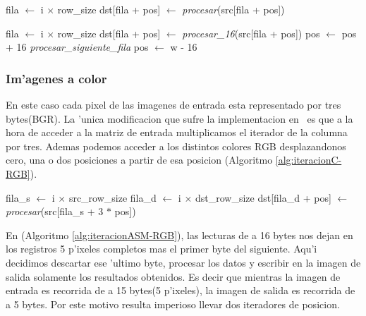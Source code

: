 \begin{algorithm}[h!]
\caption{}\label{alg:iteracionC-BN}
\begin{algorithmic}[1]
	\STATE fila $\leftarrow$ i $\times$ row\_size
		\STATE dst[fila + pos] $\leftarrow$ \textit{procesar}(src[fila + pos])
	\ENDFOR
\ENDFOR
\end{algorithmic}
\end{algorithm}

\begin{algorithm}[h!]
\caption{}\label{alg:iteracionASM-BN}
\begin{algorithmic}[1]
	\STATE fila $\leftarrow$ i $\times$ row\_size
		\STATE dst[fila + pos] $\leftarrow$ \textit{procesar_{16}}(src[fila + pos])
		\STATE pos $\leftarrow$ pos + 16		
			\STATE \textit{procesar\_siguiente\_fila}
			\STATE pos $\leftarrow$ w - 16
		\ENDIF
		
	\ENDFOR
\ENDFOR
\end{algorithmic}
\end{algorithm}

\subsubsection{Im'agenes a color}
En este caso cada pixel de las imagenes de entrada esta representado por tres bytes(BGR). La 'unica modificacion que sufre la implementacion en \C\ es que a la hora de acceder a la matriz de entrada multiplicamos el iterador de la columna por tres. Ademas podemos acceder a los distintos colores RGB desplazandonos cero, una o dos posiciones a partir de esa posicion (Algoritmo \ref{alg:iteracionC-RGB}).


\begin{algorithm}[h!]
\caption{}\label{alg:iteracionC-RGB}
\begin{algorithmic}[1]
	\STATE fila_s $\leftarrow$ i $\times$ src\_row\_size	
	\STATE fila_d $\leftarrow$ i $\times$ dst\_row\_size
		\STATE dst[fila_d + pos] $\leftarrow$ \textit{procesar}(src[fila_s + 3 $*$ pos])
	\ENDFOR
\ENDFOR
\end{algorithmic}
\end{algorithm}

En \ass (Algoritmo \ref{alg:iteracionASM-RGB}), las lecturas de a 16 bytes nos dejan en los registros 5 p'ixeles completos mas el primer byte del siguiente. Aqu'i decidimos descartar ese 'ultimo byte, procesar los datos y escribir en la imagen de salida solamente los resultados obtenidos. Es decir que mientras la imagen de entrada es recorrida de a 15 bytes(5 p'ixeles), la imagen de salida es recorrida de a 5 bytes. Por este motivo resulta imperioso llevar dos iteradores de posicion.

